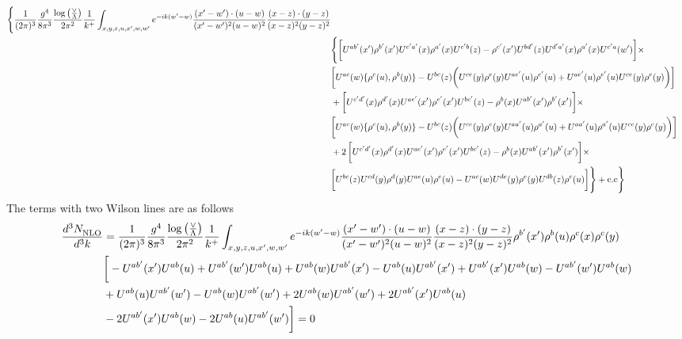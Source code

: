 \documentclass[aps,prd,amsmath,amssymb,nofootinbib]{revtex4-2}
\numberwithin{equation}{section}
\begin{document}
\begin{align}
    \Bigg\{\frac{1}{(2\pi)^{3}}\frac{g^{4}}{8\pi^{3}}\frac{\log{\left(\frac{\vee}{\Lambda}\right)}}{2\pi^{2}} \frac{1}{k^{+}}\int_{x,y,z,u,x^{\prime},w,w^{\prime}}e^{-ik(w^{\prime}-w)}\frac{(x^{\prime}-w^{\prime})\cdot (u-w)}{(x^{\prime}-w^{\prime})^{2} (u-w)^{2}} \frac{(x-z)\cdot (y-z)}{(x-z)^{2}(y-z)^{2}}\notag \\ & \Bigg\{ \bigg[U^{ab^{\prime}}(x^{\prime})\rho^{b^{\prime}}(x^{\prime})U^{c^{\prime}a^{\prime}}(x)\rho^{a^{\prime}}(x)U^{c^{\prime}b}(z)-\rho^{c^{\prime}}(x^{\prime})U^{bd^{\prime}}(z)U^{d^{\prime}a^{\prime}}(x)\rho^{a^{\prime}}(x)U^{c^{\prime}a}(w^{\prime})\bigg]\times\notag \\ & \bigg[U^{ac}(w)\{\rho^{c}(u),\rho^{b}(y)\}-U^{bc}(z)\bigg(U^{ce}(y)\rho^{e}(y)U^{ae^{\prime}}(u)\rho^{e^{\prime}}(u)+U^{ae^{\prime}}(u)\rho^{e^{\prime}}(u)U^{ce}(y)\rho^{e}(y)\bigg)\bigg]\notag \\ & +\bigg[U^{c^{\prime}d^{\prime}}(x)\rho^{d^{\prime}}(x)U^{ae^{\prime}}(x^{\prime})\rho^{e^{\prime}}(x^{\prime})U^{bc^{\prime}}(z)-\rho^{b}(x)U^{ab^{\prime}}(x^{\prime})\rho^{b^{\prime}}(x^{\prime})\bigg]\times\notag \\ &\bigg[U^{ac}(w)\{\rho^{c}(u),\rho^{b}(y)\}-U^{bc}(z)\bigg(U^{ce}(y)\rho^{e}(y)U^{aa^{\prime}}(u)\rho^{a^{\prime}}(u)+U^{aa^{\prime}}(u)\rho^{a^{\prime}}(u)U^{ce}(y)\rho^{e}(y)\bigg)\bigg]\notag \\ & + 2\, \bigg[U^{c^{\prime}d^{\prime}}(x)\rho^{d^{\prime}}(x)U^{ae^{\prime}}(x^{\prime})\rho^{e^{\prime}}(x^{\prime})U^{bc^{\prime}}(z)-\rho^{b}(x)U^{ab^{\prime}}(x^{\prime})\rho^{b^{\prime}}(x^{\prime})\bigg]\times \notag \\ & \bigg[U^{bc}(z)U^{cd}(y)\rho^{d}(y)U^{ae}(u)\rho^{e}(u)-U^{ac}(w)U^{de}(y)\rho^{e}(y)U^{db}(z)\rho^{c}(u)\bigg] \Bigg\}+\rm{c.c}\Bigg\}
\end{align}
The terms with two Wilson lines are as follows
\begin{align}
    \frac{d^{3}N_{\rm NLO}^{\rm}}{d^{3}k}  & = \frac{1}{(2\pi)^{3}}\frac{g^{4}}{8\pi^{3}}\frac{\log{\left(\frac{\vee}{\Lambda}\right)}}{2\pi^{2}} \frac{1}{k^{+}}\int_{x,y,z,u,x^{\prime},w,w^{\prime}}e^{-ik(w^{\prime}-w)}\frac{(x^{\prime}-w^{\prime})\cdot (u-w)}{(x^{\prime}-w^{\prime})^{2} (u-w)^{2}} \frac{(x-z)\cdot (y-z)}{(x-z)^{2}(y-z)^{2}}\rho^{b^{\prime}}(x^{\prime})\rho^{b}(u)\rho^{c}(x)\rho^{c}(y)\notag \\ & \bigg[-U^{ab^{\prime}}(x^{\prime})U^{ab}(u) +U^{ab^{\prime}}(w^{\prime})U^{ab}(u) + U^{ab}(w)U^{ab^{\prime}}(x^{\prime}) - U^{ab}(u)U^{ab^{\prime}}(x^{\prime}) + U^{ab^{\prime}}(x^{\prime})U^{ab}(w) - U^{ab^{\prime}}(w^{\prime})U^{ab}(w) \notag \\ & + U^{ab}(u)U^{ab^{\prime}}(w^{\prime})  - U^{ab}(w)U^{ab^{\prime}}(w^{\prime})+2U^{ab}(w)U^{ab^{\prime}}(w^{\prime}) + 2 U^{ab^{\prime}}(x^{\prime})U^{ab}(u) \notag \\ & -2 U^{ab^{\prime}}(x^{\prime})U^{ab}(w) - 2U^{ab}(u)U^{ab^{\prime}}(w^{\prime})\bigg] = 0 
\end{align}
\end{document}
